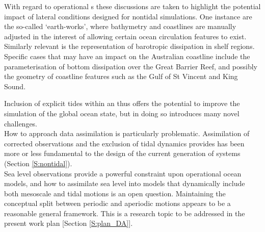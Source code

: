 With regard to operational \OGCM{}s these discussions are taken to highlight the potential impact of lateral conditions designed for nontidal simulations.  
One instance are the so-called `earth-works', where bathymetry and coastlines are manually adjusted in the interest of allowing certain ocean circulation features to exist.  
Similarly relevant is the representation of barotropic dissipation in shelf regions. 
Specific cases that may have an impact on the Australian coastline include the parameterisation of bottom dissipation over the Great Barrier Reef, and possibly the geometry of coastline features such as the Gulf of St Vincent and King Sound.




Inclusion of explicit tides within an \OGCM{} thus offers the potential to improve the simulation of the global ocean state, but in doing so introduces many novel challenges.\\
How to approach data assimilation is particularly problematic.  Assimilation of corrected observations and the exclusion of tidal dynamics provides has been more or less fundamental to the design of the current generation of \GODAE{} systems (Section \ref{S:nontidal}).\\
Sea level observations provide a powerful constraint upon operational ocean models, and how to assimilate sea level into models that dynamically include both mesoscale and tidal motions is an open question.   Maintaining the conceptual split between periodic and aperiodic motions appears to be a reasonable general framework.  This is a research topic to be addressed in the present work plan [Section \ref{S:plan_DA}]. \\

